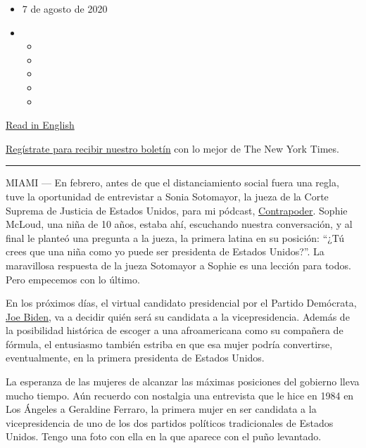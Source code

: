 \begin{itemize}
\item
  7 de agosto de 2020
\item
  \begin{itemize}
  \item
  \item
  \item
  \item
  \item
  \end{itemize}
\end{itemize}

\href{https://www.nytimes.com/2020/08/07/opinion/latina-women-politics.html}{Read
in English}

\href{https://www.nytimes.com/newsletters/el-times}{Regístrate para
recibir nuestro boletín} con lo mejor de The New York Times.

\begin{center}\rule{0.5\linewidth}{\linethickness}\end{center}

MIAMI --- En febrero, antes de que el distanciamiento social fuera una
regla, tuve la oportunidad de entrevistar a Sonia Sotomayor, la jueza de
la Corte Suprema de Justicia de Estados Unidos, para mi pódcast,
\href{https://art19.com/shows/contrapoder/episodes/fd1859ec-5a1b-4b6f-ab94-6e615c9aa787}{Contrapoder}.
Sophie McLoud, una niña de 10 años, estaba ahí, escuchando nuestra
conversación, y al final le planteó una pregunta a la jueza, la primera
latina en su posición: ``¿Tú crees que una niña como yo puede ser
presidenta de Estados Unidos?''. La maravillosa respuesta de la jueza
Sotomayor a Sophie es una lección para todos. Pero empecemos con lo
último.

En los próximos días, el virtual candidato presidencial por el Partido
Demócrata,
\href{https://www.nytimes.com/es/interactive/2020/espanol/estados-unidos/joe-biden-elecciones.html}{Joe
Biden}, va a decidir quién será su candidata a la vicepresidencia.
Además de la posibilidad histórica de escoger a una afroamericana como
su compañera de fórmula, el entusiasmo también estriba en que esa mujer
podría convertirse, eventualmente, en la primera presidenta de Estados
Unidos.

La esperanza de las mujeres de alcanzar las máximas posiciones del
gobierno lleva mucho tiempo. Aún recuerdo con nostalgia una entrevista
que le hice en 1984 en Los Ángeles a Geraldine Ferraro, la primera mujer
en ser candidata a la vicepresidencia de uno de los dos partidos
políticos tradicionales de Estados Unidos. Tengo una foto con ella en la
que aparece con el puño levantado.

